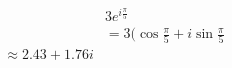 \documentclass[preview]{standalone}
\begin{document}
\begin{align*}
& 3 e^{i \frac{\pi}{5}} \\ &=  3 (\cos\frac{\pi}{5} + i\sin\frac{\pi}{5} \\ \approx  2.43  +  1.76 i
\end{align*}
\end{document}
